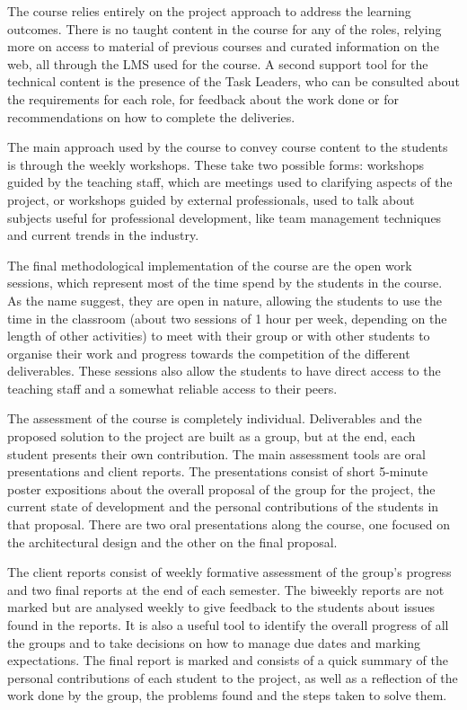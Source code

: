 The course relies entirely on the project approach to address the learning outcomes. There is no taught content in the course for any of the roles, relying more on access
to material of previous courses and curated information on the web, all through the \ac{LMS} used for the course. A second support tool for the technical content is the
presence of the Task Leaders, who can be consulted about the requirements for each role, for feedback about the work done or for recommendations on how to complete the
deliveries.

The main approach used by the course to convey course content to the students is through the weekly workshops. These take two possible forms: workshops guided by the
teaching staff, which are meetings used to clarifying aspects of the project, or workshops guided by external professionals, used to talk about subjects useful for
professional development, like team management techniques and current trends in the industry.

The final methodological implementation of the course are the open work sessions, which represent most of the time spend by the students in the course. As the name suggest,
they are open in nature, allowing the students to use the time in the classroom (about two sessions of 1 hour per week, depending on the length of other activities) to
meet with their group or with other students to organise their work and progress towards the competition of the different deliverables. These sessions also allow the
students to have direct access to the teaching staff and a somewhat reliable access to their peers.

The assessment of the course is completely individual. Deliverables and the proposed solution to the project are built as a group, but at the end, each student presents
their own contribution. The main assessment tools are oral presentations and client reports. The presentations consist of short 5-minute poster expositions about the
overall proposal of the group for the project, the current state of development and the personal contributions of the students in that proposal. There are two oral
presentations along the course, one focused on the architectural design and the other on the final proposal.

The client reports consist of weekly formative assessment of the group's progress and two final reports at the end of each semester. The biweekly reports are not marked
but are analysed weekly to give feedback to the students about issues found in the reports. It is also a useful tool to identify the overall progress of all the groups and
to take decisions on how to manage due dates and marking expectations. The final report is marked and consists of a quick summary of the personal contributions of each
student to the project, as well as a reflection of the work done by the group, the problems found and the steps taken to solve them.


